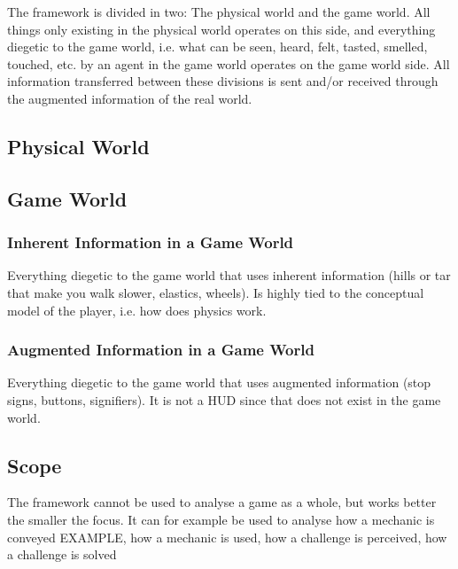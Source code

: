 The framework is divided in two: The physical world and the game world. All things only existing in the physical world operates on this side, and everything diegetic to the game world, i.e. what can be seen, heard, felt, tasted, smelled, touched, etc. by an agent in the game world operates on the game world side. All information transferred between these divisions is sent and/or received through the augmented information of the real world.

\subsection{Physical World}


\subsection{Game World}

\subsubsection{Inherent Information in a Game World}
Everything diegetic to the game world that uses inherent information (hills or tar that make you walk slower, elastics, wheels). Is highly tied to the conceptual model of the player, i.e. how does physics work. 

\subsubsection{Augmented Information in a Game World}
Everything diegetic to the game world that uses augmented information (stop signs, buttons, signifiers). It is not a HUD since that does not exist in the game world.

\subsection{Scope}
The framework cannot be used to analyse a game as a whole, but works better the smaller the focus. It can for example be used to analyse how a mechanic is conveyed EXAMPLE, how a mechanic is used, how a challenge is perceived, how a challenge is solved
